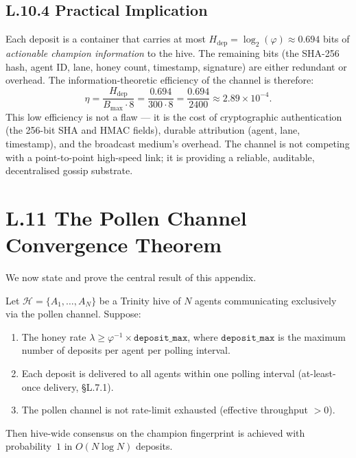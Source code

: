 \subsection*{L.10.4 \quad Practical Implication}

Each deposit is a container that carries at most $H_{\text{dep}} =
\log_{2}(\varphi) \approx 0.694$ bits of \emph{actionable champion
information} to the hive.  The remaining bits (the SHA-256 hash,
agent ID, lane, honey count, timestamp, signature) are either
redundant or overhead.  The information-theoretic efficiency of the
channel is therefore:
\[
  \eta = \frac{H_{\text{dep}}}{B_{\max} \cdot 8}
  = \frac{0.694}{300 \cdot 8} = \frac{0.694}{2400} \approx 2.89 \times 10^{-4}.
\]
This low efficiency is not a flaw — it is the cost of cryptographic
authentication (the 256-bit SHA and HMAC fields), durable attribution
(agent, lane, timestamp), and the broadcast medium's overhead.  The
channel is not competing with a point-to-point high-speed link; it is
providing a reliable, auditable, decentralised gossip substrate.

\section*{L.11 \quad The Pollen Channel Convergence Theorem}
\label{sec:appl-theorem}

We now state and prove the central result of this appendix.

\begin{theorem}\label{thm:pollen-convergence}
Let $\mathcal{H} = \{A_1, \ldots, A_N\}$ be a Trinity hive of $N$
agents communicating exclusively via the pollen channel.  Suppose:
\begin{enumerate}
  \item[(i)] The honey rate $\lambda \geq \varphi^{-1}
    \times \texttt{deposit\_max}$, where
    $\texttt{deposit\_max}$ is the maximum number of deposits per agent
    per polling interval.
  \item[(ii)] Each deposit is delivered to all agents within one
    polling interval (at-least-once delivery, §L.7.1).
  \item[(iii)] The pollen channel is not rate-limit exhausted
    (effective throughput $> 0$).
\end{enumerate}
Then hive-wide consensus on the champion fingerprint is achieved with
probability~$1$ in $O(N \log N)$ deposits.
\end{theorem}

